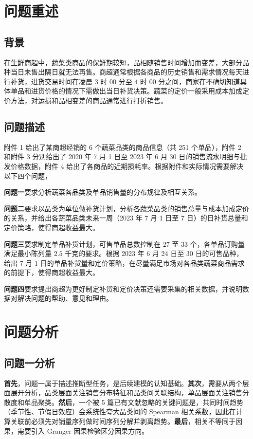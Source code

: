 \section{问题重述}

\subsection{背景}

在生鲜商超中，蔬菜类商品的保鲜期较短，品相随销售时间增加而变差，大部分品种当日未售出隔日就无法再售。商超通常根据各商品的历史销售和需求情况每天进行补货，进货交易时间在凌晨 $3$ 时 $00$ 分至 $4$ 时 $00$ 分之间，商家在不确切知道具体单品和进货价格的情况下需做出当日补货决策。蔬菜的定价一般采用成本加成定价方法，对运损和品相变差的商品通常进行打折销售。

\subsection{问题描述}

附件 1 给出了某商超经销的 6 个蔬菜品类的商品信息（共 251 个单品），附件 2 和附件 3 分别给出了 2020 年 7 月 1 日至 2023 年 6 月 30 日的销售流水明细与批发价格数据，附件 4 给出了各商品的近期损耗率。根据附件和实际情况需要解决以下四个问题，

\textbf{问题一}要求分析蔬菜各品类及单品销售量的分布规律及相互关系。

\textbf{问题二}要求以品类为单位做补货计划，分析各蔬菜品类的销售总量与成本加成定价的关系，并给出各蔬菜品类未来一周（2023 年 7 月 1 日至 7 日）的日补货总量和定价策略，使得商超收益最大。

\textbf{问题三}要求制定单品补货计划，可售单品总数控制在 $27$ 至 $33$ 个，各单品订购量满足最小陈列量 $2.5$ 千克的要求。根据 2023 年 6 月 24 日至 30 日的可售品种，给出 7 月 1 日的单品补货量和定价策略，在尽量满足市场对各品类蔬菜商品需求的前提下，使得商超收益最大。

\textbf{问题四}要求提出商超为更好制定补货和定价决策还需要采集的相关数据，并说明数据对解决问题的帮助、意见和理由。

\section{问题分析}

\subsection{问题一分析}

\textbf{首先}，问题一属于描述推断型任务，是后续建模的认知基础。\textbf{其次}，需要从两个层面展开分析，品类层面关注销售分布特征和品类间关联结构，单品层面关注销售分散度和单品聚类。\textbf{然后}，一个被 5 篇已有文献忽略的关键问题是，共同时间趋势（季节性、节假日效应）会系统性夸大品类间的 Spearman 相关系数，因此在计算关联前必须先对销量序列做时间序列分解并剥离趋势。\textbf{最后}，相关不等同于因果，需要引入 Granger 因果检验区分因果方向。

